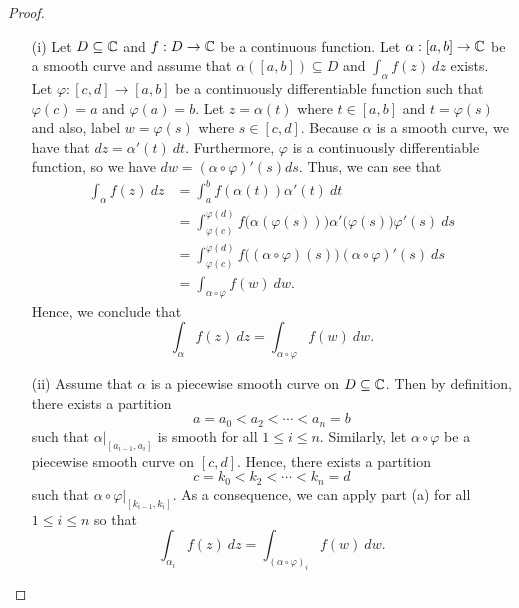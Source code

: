 \documentclass[a4paper]{article}
\begin{document}
\begin{proof}
\begin{enumerate}
    \item[(i)] Let \( D \subseteq \mathbb{C}  \) and \( f: D \to \mathbb{C}  \) be a continuous function. Let \( \alpha: [a,b] \to \mathbb{C}  \) be a smooth curve and assume that \( \alpha([a,b]) \subseteq D  \) and \( \displaystyle \int_{\alpha}^{}  f(z) \ d z \) exists. Let \( \varphi : [c,d] \to [a,b]  \) be a continuously differentiable function such that \( \varphi(c) = a  \) and \( \varphi(a) = b \). Let \( z = \alpha(t) \) where \( t \in [a,b] \) and \( t = \varphi(s) \) and also, label \( w = \varphi(s)  \) where \( s \in [c,d] \). Because \( \alpha \) is a smooth curve, we have that \( dz = \alpha'(t) \  dt \). Furthermore, \( \varphi \) is a continuously differentiable function, so we have \( dw = (\alpha \circ \varphi)'(s) ds \). Thus, we can see that      
        \begin{align*}
           \int_{ \alpha }^{  } f(z) \ dz &= \int_{ a }^{ b } f(\alpha(t)) \alpha'(t) \ dt \\
                                          &= \int_{ \varphi(c) }^{ \varphi(d) } f\Big(\alpha(\varphi(s))\Big) \alpha' \Big(  \varphi(s) \Big) \varphi'(s)  \ ds \\
                                          &= \int_{ \varphi(c) }^{ \varphi(d) } f \Big(  (\alpha \circ \varphi)(s) \Big) (\alpha \circ \varphi)'(s) \ ds \tag{Chain Rule} \\
                                          &= \int_{ \alpha \circ \varphi  }^{  }  f(w) \ dw. 
        \end{align*}
        Hence, we conclude that 
            \[ \int_{ \alpha }^{  } f(z) \ dz = \int_{ \alpha \circ \varphi }^{  } f(w) \ dw. \]
        \item[(ii)] Assume that \( \alpha  \) is a piecewise smooth curve on \( D \subseteq  \mathbb{C}  \). Then by definition, there exists a partition  
            \[  a = {a}_{0} < {a}_{2} < \cdots < {a}_{n} =  b \]
            such that \( \alpha \big|_{[{a}_{i-1}, {a}_{i}]} \) is smooth for all \( 1 \leq i \leq n \). Similarly, let \( \alpha \circ \varphi  \) be a piecewise smooth curve on \( [c,d] \). Hence, there exists a partition  
            \[  c = {k}_{0} < {k}_{2} < \cdots < {k}_{n} = d \]
            such that \( \alpha \circ \varphi \big|_{[{k}_{i-1}, {k }_{i} ]} \). As a consequence, we can apply part (a) for all \( 1 \leq i \leq n \) so that 
            \[  \int_{ {\alpha}_{i} }^{  } f(z) \ dz = \int_{ (\alpha \circ \varphi)_i }^{  } f(w) \ dw. \]

\end{enumerate}
\end{proof}
\end{document}
